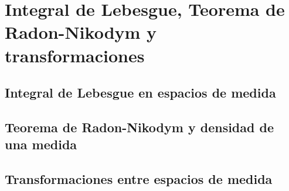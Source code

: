 \chapter{Integral de Lebesgue, Teorema de Radon-Nikodym y transformaciones}

\section{Integral de Lebesgue en espacios de medida}

\section{Teorema de Radon-Nikodym y densidad de una medida}

\section{Transformaciones entre espacios de medida}
